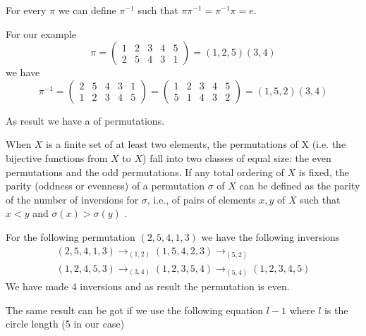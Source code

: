 \begin{appendices}
\begin{example}[Permutation]
  For every $\pi$ we can define $\pi^{-1}$ such that
  $\pi \pi^{-1} = \pi^{-1} \pi = e$.

  For our example
  \[
  \pi = \begin{pmatrix}
    1 & 2 & 3 & 4 & 5 \\
    2 & 5 & 4 & 3 & 1
  \end{pmatrix} = (1,2,5)(3,4)
  \]
  we have
  \[
  \pi^{-1} = \begin{pmatrix}   
    2 & 5 & 4 & 3 & 1 \\
    1 & 2 & 3 & 4 & 5 
  \end{pmatrix} =
  \begin{pmatrix}   
    1 & 2 & 3 & 4 & 5 \\
    5 & 1 & 4 & 3 & 2 
  \end{pmatrix} = (1,5,2)(3,4)
  \]

  As result we have a  of permutations.
  \label{ex:permutation}
\end{example}

\begin{definition}
  When $X$ is a finite set of at least two elements, the permutations of
  X (i.e. the bijective functions from $X$ to $X$) fall into two classes
  of equal size: the even permutations and the odd permutations. If
  any total ordering of $X$ is fixed, the parity (oddness or evenness)
  of a permutation $\sigma$ of $X$ can be defined as the
  parity of the number of inversions for $\sigma$, i.e., of pairs of elements
  $x, y$ of $X$ such that $x < y$ and $\sigma (x) > \sigma (y)$
  \cite{wiki:paritypermutation}.  
  \label{def:paritypermutation}
\end{definition}

\begin{example}
  For the following permutation $(2,5,4,1,3)$ we have the following
  inversions
  \begin{eqnarray}
    (2,5,4,1,3) \to_{(1,2)}
    (1,5,4,2,3) \to_{(5,2)}
    \nonumber \\
    (1,2,4,5,3) \to_{(3,4)}
    (1,2,3,5,4) \to_{(5,4)}
    (1,2,3,4,5)
    \nonumber
  \end{eqnarray}
  We have made 4 inversions and as result the permutation is even.

  The same result can be got if we use the following equation $l - 1$
  where $l$ is the circle length (5 in our case) 
  \label{ex:paritypermutation}
\end{example}


\end{appendices}
